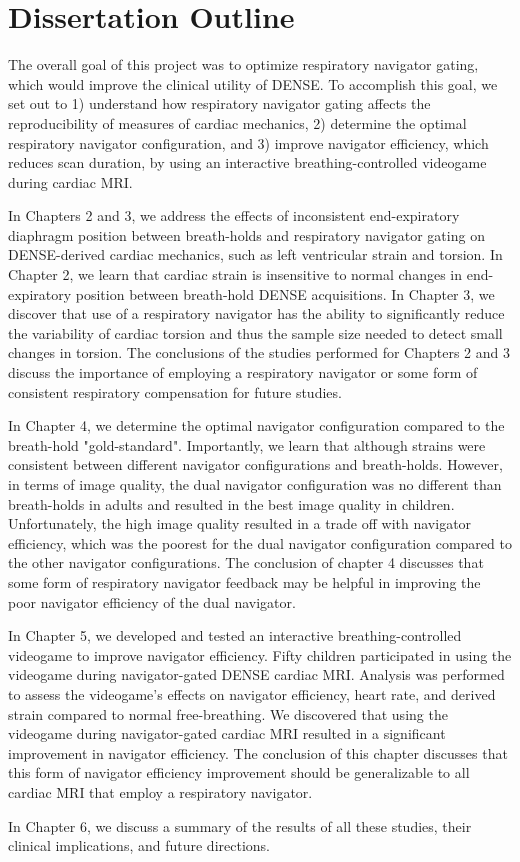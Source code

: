 \section{Dissertation Outline}
	The overall goal of this project was to optimize respiratory navigator gating, which would improve the clinical utility of DENSE. To accomplish this goal, we set out to 1) understand how respiratory navigator gating affects the reproducibility of measures of cardiac mechanics, 2) determine the optimal respiratory navigator configuration, and 3) improve navigator efficiency, which reduces scan duration, by using an interactive breathing-controlled videogame during cardiac MRI.
	
	\indent In Chapters 2 and 3, we address the effects of inconsistent end-expiratory diaphragm position between breath-holds and respiratory navigator gating on DENSE-derived cardiac mechanics, such as left ventricular strain and torsion. In Chapter 2, we learn that cardiac strain is insensitive to normal changes in end-expiratory position between breath-hold DENSE acquisitions. In Chapter 3, we discover that use of a respiratory navigator has the ability to significantly reduce the variability of cardiac torsion and thus the sample size needed to detect small changes in torsion. The conclusions of the studies performed for Chapters 2 and 3 discuss the importance of employing a respiratory navigator or some form of consistent respiratory compensation for future studies.
	
	\indent In Chapter 4, we determine the optimal navigator configuration compared to the breath-hold "gold-standard". Importantly, we learn that although strains were consistent between different navigator configurations and breath-holds. However, in terms of image quality, the dual navigator configuration was no different than breath-holds in adults and resulted in the best image quality in children. Unfortunately, the high image quality resulted in a trade off with navigator efficiency, which was the poorest for the dual navigator configuration compared to the other navigator configurations. The conclusion of chapter 4 discusses that some form of respiratory navigator feedback may be helpful in improving the poor navigator efficiency of the dual navigator.
	
	\indent In Chapter 5, we developed and tested an interactive breathing-controlled videogame to improve navigator efficiency. Fifty children participated in using the videogame during navigator-gated DENSE cardiac MRI. Analysis was performed to assess the videogame's effects on navigator efficiency, heart rate, and derived strain compared to normal free-breathing. We discovered that using the videogame during navigator-gated cardiac MRI resulted in a significant improvement in navigator efficiency. The conclusion of this chapter discusses that this form of navigator efficiency improvement should be generalizable to all cardiac MRI that employ a respiratory navigator.
	
	\indent In Chapter 6, we discuss a summary of the results of all these studies, their clinical implications, and future directions.

